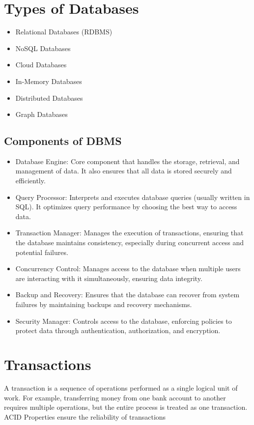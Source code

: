 \documentclass[openany]{book} %
\begin{document}
\section{Types of Databases}
\begin{itemize}
\item Relational Databases (RDBMS)
\item NoSQL Databases
\item Cloud Databases
\item In-Memory Databases
\item Distributed Databases
\item Graph Databases
\end{itemize}

\subsection{Components of DBMS}

\begin{itemize}
\item Database Engine: Core component that handles the storage, retrieval, and management of data. It also ensures that all data is stored securely and efficiently.
\item Query Processor: Interprets and executes database queries (usually written in SQL). It optimizes query performance by choosing the best way to access data.
\item Transaction Manager: Manages the execution of transactions, ensuring that the database maintains consistency, especially during concurrent access and potential failures.
\item Concurrency Control: Manages access to the database when multiple users are interacting with it simultaneously, ensuring data integrity.
\item Backup and Recovery: Ensures that the database can recover from system failures by maintaining backups and recovery mechanisms.
\item Security Manager: Controls access to the database, enforcing policies to protect data through authentication, authorization, and encryption.
\end{itemize}

\section{Transactions}
A transaction is a sequence of operations performed as a single logical unit of work. For example, transferring money from one bank account to another requires multiple operations, but the entire process is treated as one transaction. ACID Properties ensure the reliability of transactions
\end{document}
